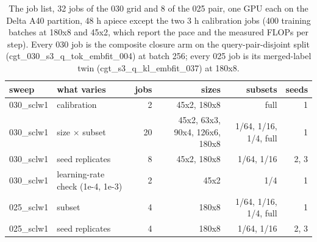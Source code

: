 
\begin{table}[htbp]
\centering\footnotesize
\caption{The job list, 32 jobs of the 030 grid and 8 of the 025 pair, one GPU each on the Delta A40 partition, 48 h apiece except the two 3 h calibration jobs (400 training batches at 180x8 and 45x2, which report the pace and the measured FLOPs per step). Every 030 job is the composite closure arm on the query-pair-disjoint split (cgt\_030\_s3\_q\_tok\_embfit\_004) at batch 256; every 025 job is its merged-label twin (cgt\_s3\_q\_kl\_embfit\_037) at 180x8.}
\label{tab:jobs}
\begin{tabular}{llrrrr}
\toprule
sweep & what varies & jobs & sizes & subsets & seeds \\
\midrule
030\_sclw1 & calibration & 2 & 45x2, 180x8 & full & 1 \\
030\_sclw1 & size $\times$ subset & 20 & 45x2, 63x3, 90x4, 126x6, 180x8 & 1/64, 1/16, 1/4, full & 1 \\
030\_sclw1 & seed replicates & 8 & 45x2, 180x8 & 1/64, 1/16 & 2, 3 \\
030\_sclw1 & learning-rate check (1e-4, 1e-3) & 2 & 45x2 & 1/4 & 1 \\
025\_sclw1 & subset & 4 & 180x8 & 1/64, 1/16, 1/4, full & 1 \\
025\_sclw1 & seed replicates & 4 & 180x8 & 1/64, 1/16 & 2, 3 \\
\bottomrule
\end{tabular}
\end{table}
